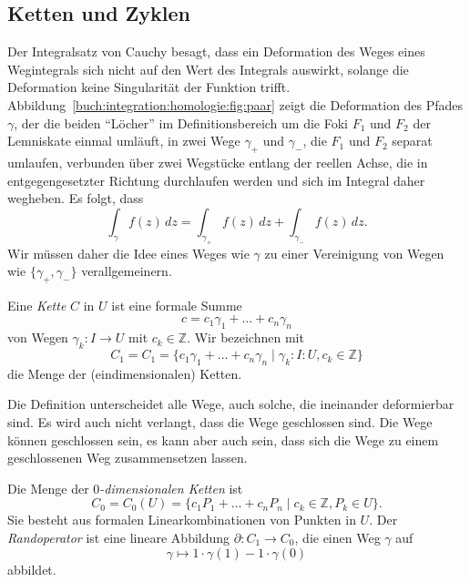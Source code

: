 %
%
%
\subsection{Ketten und Zyklen}
Der Integralsatz von Cauchy besagt, dass ein Deformation des Weges
eines Wegintegrals sich nicht auf den Wert des Integrals auswirkt,
solange die Deformation keine Singularität der Funktion trifft.
%
Abbildung~\ref{buch:integration:homologie:fig:paar}
zeigt die Deformation des Pfades $\gamma$, der die beiden ``Löcher''
im Definitionsbereich um die Foki $F_1$ und $F_2$ der Lemniskate
einmal umläuft, in zwei Wege $\gamma_+$ und $\gamma_-$, die $F_1$
und $F_2$ separat umlaufen, verbunden über zwei Wegstücke entlang
der reellen Achse, die in entgegengesetzter Richtung durchlaufen
werden und sich im Integral daher wegheben.
Es folgt, dass
\[
\int_\gamma f(z)\,dz
=
\int_{\gamma_+} f(z)\,dz
+
\int_{\gamma_-} f(z)\,dz.
\]
Wir müssen daher die Idee eines Weges wie $\gamma$ zu einer 
Vereinigung von Wegen wie $\{\gamma_+,\gamma_-\}$ verallgemeinern.

\begin{definition}[Kette]
\label{buch:integration:homologie:def:kette}
Eine \emph{Kette} $C$ in $U$ ist eine formale Summe
%
\begin{equation}
c
=
c_1\gamma_1 + \dots + c_n\gamma_n
\label{buch:integration:homologie:eqn:def:kette}
\end{equation}
von Wegen $\gamma_k\colon I \to U$ mit $c_k\in\mathbb{Z}$.
Wir bezeichnen mit
\[
C_1
=
C_1
=
\{
c_1\gamma_1+\ldots+c_n\gamma_n
\mid
\gamma_k:I\colon U, c_k\in \mathbb{Z}
\}
\]
die Menge der (eindimensionalen) Ketten.
\end{definition}

Die Definition unterscheidet alle Wege, auch solche, die ineinander
deformierbar sind.
%
Es wird auch nicht verlangt, dass die Wege geschlossen sind.
Die Wege können geschlossen sein, es kann aber auch sein, dass sich
die Wege zu einem geschlossenen Weg zusammensetzen lassen.

\begin{definition}[Randoperator]
\label{buch:integration:homologie:definition:randoperator}
Die Menge der \emph{$0$-dimensionalen Ketten} ist
%
\[
C_0 
=
C_0(U)
=
\{
c_1P_1+\ldots+c_nP_n
\mid
c_k\in \mathbb{Z}, P_k\in U
\}.
\]
Sie besteht aus formalen Linearkombinationen von Punkten in $U$.
Der \emph{Randoperator} ist eine
%
lineare Abbildung $\partial \colon C_1\to C_0$, die einen
Weg $\gamma$ auf
\[
\gamma \mapsto 1\cdot \gamma(1) - 1\cdot \gamma(0)
\]
abbildet.
\end{definition}

